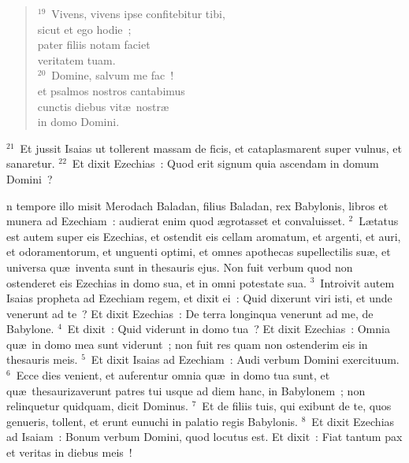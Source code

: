 \begin{verse}
${}^{19}$~Vivens, vivens ipse confitebitur tibi,\\ sicut et ego hodie~;\\ pater filiis notam faciet\\ veritatem tuam.\\
${}^{20}$~Domine, salvum me fac~!\\ et psalmos nostros cantabimus\\ cunctis diebus vit\ae\ nostr\ae \\ in domo Domini.\end{verse}


${}^{21}$~Et jussit Isaias ut tollerent massam de ficis, et cataplasmarent super vulnus, et sanaretur.
${}^{22}$~Et dixit Ezechias~: Quod erit signum quia ascendam in domum Domini~?

\bchapter
{}n tempore illo misit Merodach Baladan, filius Baladan, rex Babylonis, libros et munera ad Ezechiam~: audierat enim quod \ae grotasset et convaluisset.
${}^{2}$~L\ae tatus est autem super eis Ezechias, et ostendit eis cellam aromatum, et argenti, et auri, et odoramentorum, et unguenti optimi, et omnes apothecas supellectilis su\ae , et universa qu\ae\ inventa sunt in thesauris ejus. Non fuit verbum quod non ostenderet eis Ezechias in domo sua, et in omni potestate sua.
${}^{3}$~Introivit autem Isaias propheta ad Ezechiam regem, et dixit ei~: Quid dixerunt viri isti, et unde venerunt ad te~? Et dixit Ezechias~: De terra longinqua venerunt ad me, de Babylone.
${}^{4}$~Et dixit~: Quid viderunt in domo tua~? Et dixit Ezechias~: Omnia qu\ae\ in domo mea sunt viderunt~; non fuit res quam non ostenderim eis in thesauris meis.
${}^{5}$~Et dixit Isaias ad Ezechiam~: Audi verbum Domini exercituum.
${}^{6}$~Ecce dies venient, et auferentur omnia qu\ae\ in domo tua sunt, et qu\ae\ thesaurizaverunt patres tui usque ad diem hanc, in Babylonem~; non relinquetur quidquam, dicit Dominus.
${}^{7}$~Et de filiis tuis, qui exibunt de te, quos genueris, tollent, et erunt eunuchi in palatio regis Babylonis.
${}^{8}$~Et dixit Ezechias ad Isaiam~: Bonum verbum Domini, quod locutus est. Et dixit~: Fiat tantum pax et veritas in diebus meis~!
